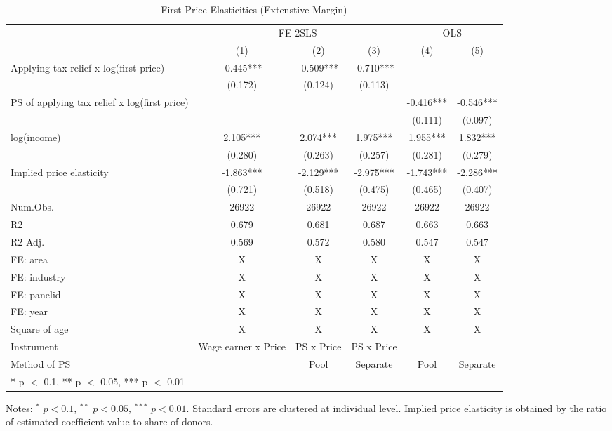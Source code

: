 \documentclass[
  11pt,
  a4paper,
]{article}
\begin{document}
\begin{table}

\caption{\label{tab:extensive}First-Price Elasticities (Extenstive Margin)}
\centering
\fontsize{9}{11}\selectfont
\begin{threeparttable}
\begin{tabular}[t]{lccccc}
\toprule
\multicolumn{1}{c}{ } & \multicolumn{3}{c}{FE-2SLS} & \multicolumn{2}{c}{OLS} \\
\cmidrule(l{3pt}r{3pt}){2-4} \cmidrule(l{3pt}r{3pt}){5-6}
  & (1) & (2) & (3) & (4) & (5)\\
\midrule
Applying tax relief x log(first price) & -0.445*** & -0.509*** & -0.710*** &  & \\
 & (0.172) & (0.124) & (0.113) &  & \\
PS of applying tax relief x log(first price) &  &  &  & -0.416*** & -0.546***\\
 &  &  &  & (0.111) & (0.097)\\
log(income) & 2.105*** & 2.074*** & 1.975*** & 1.955*** & 1.832***\\
 & (0.280) & (0.263) & (0.257) & (0.281) & (0.279)\\
\midrule
Implied price elasticity & -1.863*** & -2.129*** & -2.975*** & -1.743*** & -2.286***\\
 & (0.721) & (0.518) & (0.475) & (0.465) & (0.407)\\
Num.Obs. & 26922 & 26922 & 26922 & 26922 & 26922\\
R2 & 0.679 & 0.681 & 0.687 & 0.663 & 0.663\\
R2 Adj. & 0.569 & 0.572 & 0.580 & 0.547 & 0.547\\
FE: area & X & X & X & X & X\\
FE: industry & X & X & X & X & X\\
FE: panelid & X & X & X & X & X\\
FE: year & X & X & X & X & X\\
Square of age & X & X & X & X & X\\
Instrument & Wage earner x Price & PS x Price & PS x Price &  & \\
Method of PS &  & Pool & Separate & Pool & Separate\\
\bottomrule
\multicolumn{6}{l}{\rule{0pt}{1em}* p $<$ 0.1, ** p $<$ 0.05, *** p $<$ 0.01}\\
\end{tabular}
\begin{tablenotes}
\item Notes: $^{*}$ $p < 0.1$, $^{**}$ $p < 0.05$, $^{***}$ $p < 0.01$. Standard errors are clustered at individual level. Implied price elasticity is obtained by the ratio of estimated coefficient value to share of donors.
\end{tablenotes}
\end{threeparttable}
\end{table}
\end{document}
